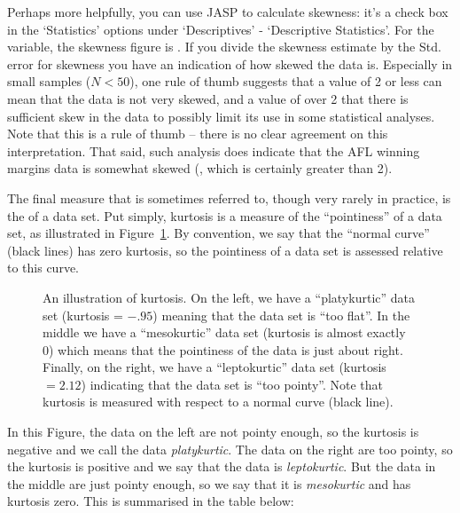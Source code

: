 Perhaps more helpfully, you can use JASP to calculate skewness: it's a check box in the `Statistics' options under `Descriptives' - `Descriptive Statistics'. For the  variable, the skewness figure is . If you divide the skewness estimate by the Std. error for skewness you have an indication of how skewed the data is. Especially in small samples ($N<50$), one rule of thumb suggests that a value of 2 or less can mean that the data is not very skewed, and a value of over 2 that there is sufficient skew in the data to possibly limit its use in some statistical analyses. Note that this is a rule of thumb -- there is no clear agreement on this interpretation. That said, such analysis does indicate that the AFL winning margins data is somewhat skewed (, which is certainly greater than 2). 

The final measure that is sometimes referred to, though very rarely in practice, is the  of a data set. Put simply, kurtosis is a measure of the ``pointiness'' of a data set, as illustrated in Figure~\ref{fig:kurtosis}. By convention, we say that the ``normal curve'' (black lines) has zero kurtosis, so the pointiness of a data set is assessed relative to this curve. 

\begin{figure}[htb]
\begin{center}
\caption{An illustration of kurtosis. On the left, we have a ``platykurtic'' data set (kurtosis = $-.95$) meaning that the data set is ``too flat''. In the middle we have a ``mesokurtic'' data set (kurtosis is almost exactly 0) which means that the pointiness of the data is just about right. Finally, on the right, we have a ``leptokurtic'' data set (kurtosis $= 2.12$) indicating that the data set is ``too pointy''. Note that kurtosis is measured with respect to a normal curve (black line).}
\label{fig:kurtosis}
\HR
\end{center}
\end{figure}

In this Figure, the data on the left are not pointy enough, so the kurtosis is negative and we call the data {\it platykurtic}. The data on the right are too pointy, so the kurtosis is positive and we say that the data is {\it leptokurtic}. But the data in the middle are just pointy enough, so we say that it is {\it mesokurtic} and has kurtosis zero. This is summarised in the table below:

